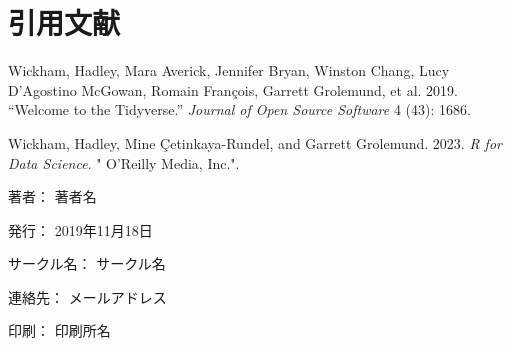 \documentclass[
  b5paper,
  xelatex, ja=standard]{bxjsbook}
\newlength{\cslhangindent}
\newenvironment{CSLReferences}[2] %
 {\begin{list}{}{%
  \setlength{\itemindent}{0pt}
  \setlength{\leftmargin}{0pt}
  \setlength{\parsep}{0pt}
  \ifodd #1
   \setlength{\leftmargin}{\cslhangindent}
   \setlength{\itemindent}{-1\cslhangindent}
  \fi
  \setlength{\itemsep}{#2\baselineskip}}}
 {\end{list}}
\begin{document}

\chapter{引用文献}\label{ux5f15ux7528ux6587ux732e}

\label{refs}
\begin{CSLReferences}{1}{0}
Wickham, Hadley, Mara Averick, Jennifer Bryan, Winston Chang, Lucy
D'Agostino McGowan, Romain François, Garrett Grolemund, et al. 2019.
{``Welcome to the Tidyverse.''} \emph{Journal of Open Source Software} 4
(43): 1686.

Wickham, Hadley, Mine Çetinkaya-Rundel, and Garrett Grolemund. 2023.
\emph{R for Data Science}. " O'Reilly Media, Inc.".

\end{CSLReferences}



\clearpage
{}
\begin{flushright}
\begin{minipage}{0.5\hsize}
\begin{description}
  \item{著者：} 著者名
  \item{発行：} 2019年11月18日
  \item{サークル名：} サークル名
  \item{連絡先：} メールアドレス
  \item{印刷：} 印刷所名
\end{description}
\end{minipage}
\end{flushright}
\clearpage
\end{document}
